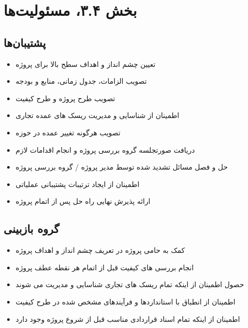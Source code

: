 \chapter{بخش ۳.۴، مسئولیت‌ها}

\section{پشتیبان‌ها}
\begin{itemize}
\item تعیین چشم انداز و اهداف سطح بالا برای پروژه
\item تصویب الزامات، جدول زمانی، منابع و بودجه
\item تصویب طرح پروژه و طرح کیفیت
\item اطمینان از شناسایی و مدیریت ریسک های عمده تجاری
\item تصویب هرگونه تغییر عمده در حوزه
\item دریافت صورتجلسه گروه بررسی پروژه و انجام اقدامات لازم
\item حل و فصل مسائل تشدید شده توسط مدیر پروژه / گروه بررسی پروژه
\item اطمینان از ایجاد ترتیبات پشتیبانی عملیاتی
\item ارائه پذیرش نهایی راه حل پس از اتمام پروژه
\end{itemize}

\section{گروه بازبینی}
\begin{itemize}
\item کمک به حامی پروژه در تعریف چشم انداز و اهداف پروژه
\item انجام بررسی های کیفیت قبل از اتمام هر نقطه عطف پروژه
\item حصول اطمینان از اینکه تمام ریسک های تجاری شناسایی و مدیریت می شوند
\item اطمینان از انطباق با استانداردها و فرآیندهای مشخص شده در طرح کیفیت
\item اطمینان از اینکه تمام اسناد قراردادی مناسب قبل از شروع پروژه وجود دارد
\end{itemize}

